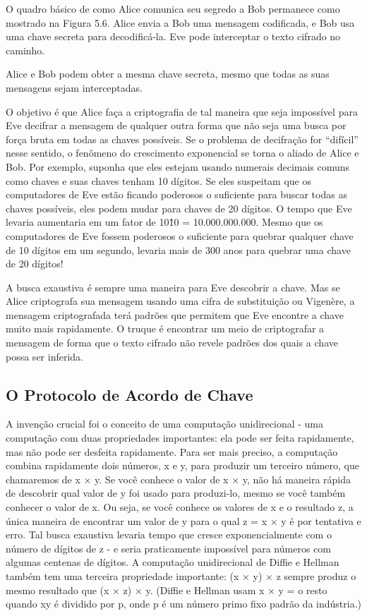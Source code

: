 \documentclass{book}
\begin{document}
O quadro básico de como Alice comunica seu segredo a Bob permanece como mostrado na Figura 5.6. Alice envia a Bob uma mensagem codificada, e Bob usa uma chave secreta para decodificá-la. Eve pode interceptar o texto cifrado no caminho.

Alice e Bob podem obter a mesma chave secreta, mesmo que todas as suas mensagens sejam interceptadas.

O objetivo é que Alice faça a criptografia de tal maneira que seja impossível para Eve decifrar a mensagem de qualquer outra forma que não seja uma busca por força bruta em todas as chaves possíveis. Se o problema de decifração for ``difícil'' nesse sentido, o fenômeno do crescimento exponencial se torna o aliado de Alice e Bob. Por exemplo, suponha que eles estejam usando numerais decimais comuns como chaves e suas chaves tenham 10 dígitos. Se eles suspeitam que os computadores de Eve estão ficando poderosos o suficiente para buscar todas as chaves possíveis, eles podem mudar para chaves de 20 dígitos. O tempo que Eve levaria aumentaria em um fator de 10\^10 = 10.000.000.000. Mesmo que os computadores de Eve fossem poderosos o suficiente para quebrar qualquer chave de 10 dígitos em um segundo, levaria mais de 300 anos para quebrar uma chave de 20 dígitos!

A busca exaustiva é sempre uma maneira para Eve descobrir a chave. Mas se Alice criptografa sua mensagem usando uma cifra de substituição ou Vigenère, a mensagem criptografada terá padrões que permitem que Eve encontre a chave muito mais rapidamente. O truque é encontrar um meio de criptografar a mensagem de forma que o texto cifrado não revele padrões dos quais a chave possa ser inferida.


\subsection{O Protocolo de Acordo de Chave}
\label{segredos:prot-acordo-chave}

A invenção crucial foi o conceito de uma computação unidirecional - uma computação com duas propriedades importantes: ela pode ser feita rapidamente, mas não pode ser desfeita rapidamente. Para ser mais preciso, a computação combina rapidamente dois números, x e y, para produzir um terceiro número, que chamaremos de x × y. Se você conhece o valor de x × y, não há maneira rápida de descobrir qual valor de y foi usado para produzi-lo, mesmo se você também conhecer o valor de x. Ou seja, se você conhece os valores de x e o resultado z, a única maneira de encontrar um valor de y para o qual z = x × y é por tentativa e erro. Tal busca exaustiva levaria tempo que cresce exponencialmente com o número de dígitos de z - e seria praticamente impossível para números com algumas centenas de dígitos. A computação unidirecional de Diffie e Hellman também tem uma terceira propriedade importante: (x × y) × z sempre produz o mesmo resultado que (x × z) × y. (Diffie e Hellman usam x × y = o resto quando xy é dividido por p, onde p é um número primo fixo padrão da indústria.)
\end{document}
